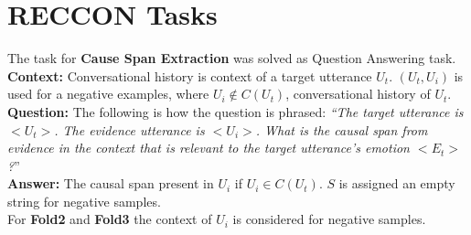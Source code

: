 \documentclass{article}
\begin{document}
{\label{app:data_emotion}
\begin{table*}[t]\small
\centering
\renewcommand{\arraystretch}{1.3}
\setlength\tabcolsep{10pt}
\vspace{1mm}
\caption{\textbf{Number of emotion labels in Fold1 after the dataset is transformed into $U_t, U_i$ pairs.} Dataset is highly unbalanced and the distribution of emotion labels in DD and IEMO are not the same.}
\label{app-tab:fold1_emotion_data}
\end{table*}
}

\section{RECCON Tasks}
\label{app:reccon_tasks}
The task for \textbf{Cause Span Extraction} was solved as Question Answering task.
\textbf{Context:} Conversational history is context of a target utterance $U_t$. $(U_t, U_i)$ is used for a negative examples, where $U_i \notin C(U_t)$, conversational history of $U_t$. \\
\textbf{Question:} The following is how the question is phrased: \textit{“The target utterance is $<U_t>$. The evidence utterance is $<U_i>$. What is the causal span from evidence in the context that is relevant to the target utterance’s emotion $<E_t>$?}”\\
\textbf{Answer:} The causal span present in $U_i$ if $U_i \in C(U_t)$. $S$ is assigned an empty string for negative samples.\\
For \textbf{Fold2} and \textbf{Fold3} the context of $U_i$ is considered for negative samples.
\end{document}
